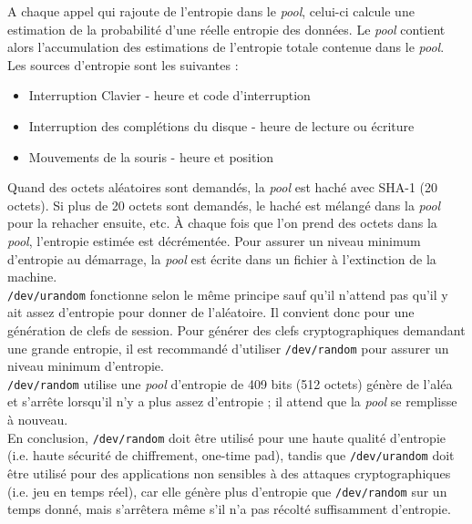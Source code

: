 			A chaque appel qui rajoute de l'entropie dans le \textit{pool}, 
			celui-ci calcule une estimation de la probabilité d'une réelle 
			entropie des données. 
			Le \textit{pool} contient alors l'accumulation des estimations 
			de l'entropie totale contenue dans le \textit{pool}.\\
						
			Les sources d'entropie sont les suivantes :
			\begin{itemize}
			\item Interruption Clavier - heure et code d'interruption 
			\item Interruption des complétions du disque - heure de 
			lecture ou écriture
			\item Mouvements de la souris - heure et position\\
			\end{itemize}
			
			Quand des octets aléatoires sont demandés, la \textit{pool} 
			est haché avec SHA-1 (20 octets). Si plus de 20 octets 
			sont demandés, le haché est mélangé dans la \textit{pool} 
			pour la rehacher ensuite, etc. À chaque fois que l'on prend des 
			octets dans la \textit{pool}, l'entropie estimée est décrémentée. 
			Pour assurer un niveau minimum d'entropie au démarrage, 
			la \textit{pool} est écrite dans un fichier à l'extinction 
			de la machine.\\
			
			\texttt{/dev/urandom} fonctionne selon le même principe sauf 
			qu'il n'attend pas qu'il y ait assez d'entropie pour donner de 
			l'aléatoire. Il convient donc pour une génération de clefs de session. 
			Pour générer des clefs cryptographiques demandant une grande entropie, il 
			est recommandé d'utiliser \texttt{/dev/random} pour assurer 
			un niveau minimum d'entropie.\\
			
			\texttt{/dev/random} utilise une \textit{pool} d'entropie de 409
			bits (512 octets) génère de l'aléa et s'arrête lorsqu'il n'y a 
			plus assez d'entropie ; il attend que la \textit{pool} se remplisse 
			à nouveau.\\
			
			En conclusion, \texttt{/dev/random} doit être utilisé pour une haute 
			qualité d'entropie (i.e. haute sécurité de chiffrement, one-time
			pad), tandis que \texttt{/dev/urandom} doit être utilisé pour des
			applications non sensibles à des attaques cryptographiques 
			(i.e. jeu en temps réel), car elle génère plus d'entropie que 
			\texttt{/dev/random} sur un temps donné, mais s'arrêtera même 
			s'il n'a pas récolté suffisamment d'entropie.\\

